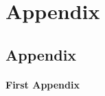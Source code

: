 \documentclass[onesided]{article}\usepackage[]{graphicx}\usepackage[]{color}
\begin{document}
\newpage
{}
\setcounter{page}{1}
\section{Appendix} 

\setcounter{table}{0}
\renewcommand{\thetable}{A\arabic{table}}
\setcounter{figure}{0}
\renewcommand{\thefigure}{A\arabic{figure}}



\subsection{Appendix}




\paragraph{First Appendix} 










\linespread{2}
\end{document}
